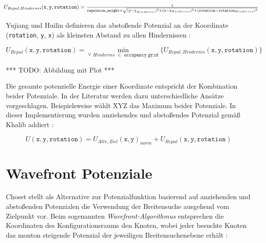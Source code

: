 \begin{equation*}
\hspace*{-0.04\linewidth}
\resizebox{1.1\linewidth}{!}{
  $ U_{Repul, Hindernis}(\texttt{x}, \texttt{y}, \texttt{rotation}) = \frac{1}{\texttt{repulsion\_weight} + \sqrt{(\texttt{y} - \texttt{y}_{Hindernis})^2 + (\texttt{x} - \texttt{x}_{Hindernis})^2 + (\texttt{rotation} - \texttt{rotation}_{Hindernis})^2}}
$ 
}
\hspace*{-0.06\linewidth}
\end{equation*}

Yujiang und Huilin definieren das abstoßende Potenzial an der Koordinate (\texttt{rotation}, \texttt{y}, \texttt{x}) als kleinsten Abstand zu allen Hindernissen \cite{yujiang.2017}:

\begin{equation*}
U_{Repul}(\texttt{x}, \texttt{y}, \texttt{rotation}) = \min_{\forall \,\,Hindernis \,\,\in \texttt{ occupancy\_grid}} \{ U_{Repul, Hindernis}(\texttt{x}, \texttt{y}, \texttt{rotation}) \}
\end{equation*}

*** TODO: Abbildung mit Plot ***

Die gesamte potenzielle Energie einer Koordinate entspricht der Kombination beider Potenziale.
In der Literatur werden dazu unterschiedliche Ansätze vorgeschlagen. Beispielsweise wählt XYZ das Maximum beider Potenziale. In dieser Implementierung wurden anziehendes und abstoßendes Potenzial gemäß Khalib addiert \cite{khatib.1985}: 

\begin{equation*}
U(\texttt{x}, \texttt{y}, \texttt{rotation}) = U_{Attr, Ziel}(\texttt{x}, \texttt{y})_{norm} + U_{Repul}(\texttt{x}, \texttt{y}, \texttt{rotation})
\end{equation*}



\section{Wavefront Potenziale}

Choset stellt als Alternative zur Potenzialfunktion basierend auf anziehenden und abstoßenden Potenzialen die Verwendung der Breitensuche ausgehend vom Zielpunkt vor. Beim sogenannten \textit{Wavefront-Algorithmus} entsprechen die Koordinaten des Konfigurationsraums den Knoten, wobei jeder besuchte Knoten das monton steigende Potenzial der jeweiligen Breitensuchenebene erhält \cite{choset.2007}:

